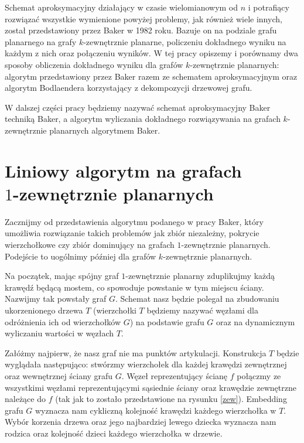 \documentclass[twoside,a4paper,12pt]{report} %
\theoremstyle{break}
\begin{document}
Schemat aproksymacyjny działający w czasie wielomianowym od $n$ i potrafiący rozwiązać wszystkie wymienione powyżej problemy, jak również wiele innych, został przedstawiony przez Baker w 1982 roku. Bazuje on na podziale grafu planarnego na grafy $k$-zewnętrznie planarne, policzeniu dokładnego wyniku na każdym z nich oraz połączeniu wyników. W tej pracy opiszemy i porównamy dwa sposoby obliczenia dokładnego wyniku dla grafów $k$-zewnętrznie planarnych: algorytm przedstawiony przez Baker razem ze schematem aproksymacyjnym oraz algorytm Bodlaendera korzystający z dekompozycji drzewowej grafu.

W dalszej części pracy będziemy nazywać schemat aproksymacyjny Baker techniką Baker, a algorytm wyliczania dokładnego rozwiązywania na grafach $k$-zewnętrznie planarnych algorytmem Baker.  



\chapter[Liniowy algorytm na grafach 1-zewnętrznie planarnych]{Liniowy algorytm na grafach \\ $1$-zewnętrznie planarnych} \label{sec.zewn}
Zacznijmy od przedstawienia algorytmu podanego w pracy Baker, który umożliwia rozwiązanie takich problemów jak zbiór niezależny, pokrycie wierzchołkowe czy zbiór dominujący na grafach $1$-zewnętrznie planarnych. Podejście to uogólnimy później dla grafów $k$-zewnętrznie planarnych.

Na początek, mając spójny graf $1$-zewnętrznie planarny zduplikujmy każdą krawędź będącą mostem, co spowoduje powstanie w tym miejscu ściany. Nazwijmy tak powstały graf $G$. Schemat nasz będzie polegał na zbudowaniu ukorzenionego drzewa $T$ (wierzchołki $T$ będziemy nazywać węzłami dla odróżnienia ich od wierzchołków $G$) na podstawie grafu $G$ oraz na dynamicznym wyliczaniu wartości w węzłach $T$.

Załóżmy najpierw, że nasz graf nie ma punktów artykulacji.
Konstrukcja $T$ będzie wyglądała następująco: stwórzmy wierzchołek dla każdej krawędzi zewnętrznej oraz wewnętrznej ściany grafu $G$. Węzeł reprezentujący ścianę $f$ połączmy ze wszystkimi węzłami reprezentującymi sąsiednie ściany oraz krawędzie zewnętrzne należące do $f$ (tak jak to zostało przedstawione na rysunku \ref{zew}). Embedding grafu $G$ wyznacza nam cykliczną kolejność krawędzi każdego wierzchołka w $T$. Wybór korzenia drzewa oraz jego najbardziej lewego dziecka wyznacza nam rodzica oraz kolejność dzieci każdego wierzchołka w drzewie.
\end{document}

